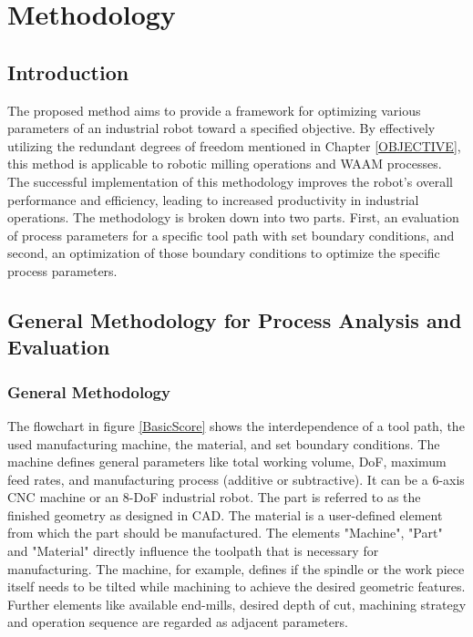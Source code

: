 \chapter{Methodology}%

\section{Introduction}%

The proposed method aims to provide a framework for optimizing various parameters of an industrial robot toward a specified objective. By effectively utilizing the redundant degrees of freedom mentioned in Chapter \ref{OBJECTIVE}, this method is applicable to robotic milling operations and WAAM processes. The successful implementation of this methodology improves the robot's overall performance and efficiency, leading to increased productivity in industrial operations. The methodology is broken down into two parts. First, an evaluation of process parameters for a specific tool path with set boundary conditions, and second, an optimization of those boundary conditions to optimize the specific process parameters.

\section{General Methodology for Process Analysis and Evaluation}
\subsection{General Methodology}\label{general}

The flowchart in figure \ref{BasicScore} shows the interdependence of a tool path, the used manufacturing machine, the material, and set boundary conditions. The machine defines general parameters like total working volume, DoF, maximum feed rates, and manufacturing process (additive or subtractive). It can be a 6-axis CNC machine or an 8-DoF industrial robot. The part is referred to as the finished geometry as designed in CAD. The material is a user-defined element from which the part should be manufactured. The elements "Machine", "Part" and "Material" directly influence the toolpath that is necessary for manufacturing. The machine, for example, defines if the spindle or the work piece itself needs to be tilted while machining to achieve the desired geometric features. Further elements like available end-mills, desired depth of cut, machining strategy and operation sequence are regarded as adjacent parameters. 


